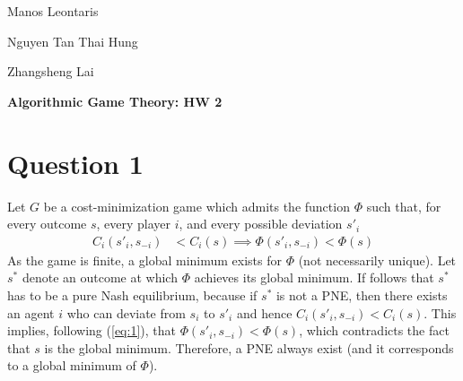 \documentclass[a4paper,12pt]{article}
\theoremstyle{definition}
\begin{document}
\begin{flushright}
	Manos Leontaris
	
	Nguyen Tan Thai Hung
	
	Zhangsheng Lai
\end{flushright}

\begin{center}
	\Huge{\bfseries Algorithmic Game Theory: HW 2}
\end{center}

\section*{Question 1}

Let $G$ be a cost-minimization game which admits the function $\Phi$ such that, for every outcome $s$, every player $i$, and every possible deviation $s'_i$
\begin{align} \label{eq:1}
	C_i(s'_i,s_{-i})&<C_i(s) \implies \Phi(s'_i,s_{-i}) <\Phi(s)
\end{align}
As the game is finite, a global minimum exists for $\Phi$ (not necessarily unique). Let $s^*$ denote an outcome at which $\Phi$ achieves its global minimum. If follows that $s^*$ has to be a pure Nash equilibrium, because if $s^*$ is not a PNE, then there exists an agent $i$ who can deviate from $s_i$ to $s'_i$ and hence $C_i(s'_i,s_{-i}) <C_i(s)$. This implies, following (\ref{eq:1}), that $\Phi(s'_i,s_{-i}) <\Phi(s)$, which contradicts the fact that $s$ is the global minimum. Therefore, a PNE always exist (and it corresponds to a global minimum of $\Phi$).
\end{document}
